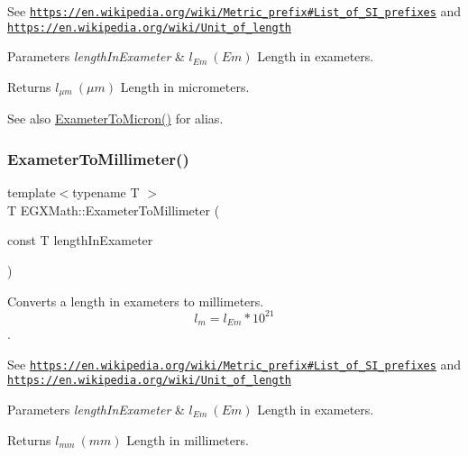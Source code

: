 See \href{https://en.wikipedia.org/wiki/Metric_prefix#List_of_SI_prefixes}{\tt https\+://en.\+wikipedia.\+org/wiki/\+Metric\+\_\+prefix\#\+List\+\_\+of\+\_\+\+S\+I\+\_\+prefixes} and \href{https://en.wikipedia.org/wiki/Unit_of_length}{\tt https\+://en.\+wikipedia.\+org/wiki/\+Unit\+\_\+of\+\_\+length} 
\begin{DoxyParams}{Parameters}
{\em length\+In\+Exameter} & $ l_{Em}\ (Em)$ Length in exameters. \\
\hline
\end{DoxyParams}
\begin{DoxyReturn}{Returns}
$ l_{\mu m}\ (\mu m)$ Length in micrometers. 
\end{DoxyReturn}
\begin{DoxySeeAlso}{See also}
\mbox{\hyperlink{group___e_g_x_math-_conversions-_length_conversions-_exameter-_non-_s_i_ga3356bb6585e02757a196b299c29660c1}{Exameter\+To\+Micron()}} for alias. 
\end{DoxySeeAlso}
\mbox{\label{group___e_g_x_math-_conversions-_length_conversions-_exameter-_s_i_ga71baa21a517793479c9bbb9e1a5c713b}} 
\subsubsection{\texorpdfstring{Exameter\+To\+Millimeter()}{ExameterToMillimeter()}}
{\footnotesize\ttfamily template$<$typename T $>$ \\
T E\+G\+X\+Math\+::\+Exameter\+To\+Millimeter (\begin{DoxyParamCaption}\item[{const T}]{length\+In\+Exameter }\end{DoxyParamCaption})}



Converts a length in exameters to millimeters. \[ l_{m}=l_{Em} * 10^{21} \]. 

See \href{https://en.wikipedia.org/wiki/Metric_prefix#List_of_SI_prefixes}{\tt https\+://en.\+wikipedia.\+org/wiki/\+Metric\+\_\+prefix\#\+List\+\_\+of\+\_\+\+S\+I\+\_\+prefixes} and \href{https://en.wikipedia.org/wiki/Unit_of_length}{\tt https\+://en.\+wikipedia.\+org/wiki/\+Unit\+\_\+of\+\_\+length} 
\begin{DoxyParams}{Parameters}
{\em length\+In\+Exameter} & $ l_{Em}\ (Em)$ Length in exameters. \\
\hline
\end{DoxyParams}
\begin{DoxyReturn}{Returns}
$ l_{mm}\ (mm)$ Length in millimeters. 
\end{DoxyReturn}
\mbox{\label{group___e_g_x_math-_conversions-_length_conversions-_exameter-_s_i_ga78c5c3f8008fc44c81b3d89b44d3db19}} 

